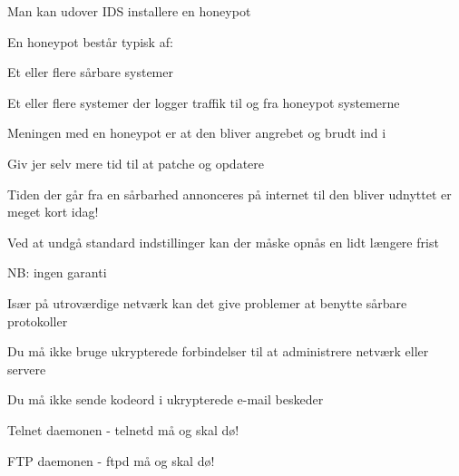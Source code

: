 \documentclass[Screen16to9,17pt]{foils}
\begin{document}

\begin{list1}
\item Man kan udover IDS installere en honeypot
\item En honeypot består typisk af:
  \begin{list2}
    \item Et eller flere sårbare systemer
\item Et eller flere systemer der logger traffik til og fra honeypot
  systemerne
  \end{list2}
\item Meningen med en honeypot er at den bliver angrebet og brudt ind
  i
\end{list1}


\begin{list1}
\item Giv jer selv mere tid til at patche og opdatere
\item Tiden der går fra en sårbarhed annonceres på internet til den bliver
       udnyttet er meget kort idag!
\item Ved at undgå standard indstillinger kan der
       måske opnås en lidt længere frist
\item NB: ingen garanti
\end{list1}








\begin{list1}
\item Især på utroværdige netværk kan det give problemer at benytte
  sårbare protokoller
\end{list1}


\begin{list1}
\item Du må ikke bruge ukrypterede forbindelser til at administrere netværk eller servere
\item Du må ikke sende kodeord i ukrypterede e-mail beskeder
\end{list1}

\centerline{\hlkbig Telnet daemonen - telnetd må og skal dø!}

\pause
\centerline{\hlkbig FTP daemonen - ftpd må og skal dø!}
\end{document}
